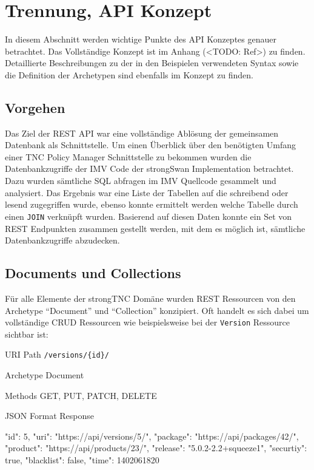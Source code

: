 \section{Trennung, API Konzept}
In diesem Abschnitt werden wichtige Punkte des API Konzeptes genauer betrachtet.
Das Vollständige Konzept ist im Anhang (<TODO: Ref>) zu finden. Detaillierte
Beschreibungen zu der in den Beispielen verwendeten Syntax sowie die Definition
der Archetypen sind ebenfalls im Konzept zu finden.

\subsection{Vorgehen}
Das Ziel der REST API war eine vollständige Ablösung der gemeinsamen Datenbank
als Schnittstelle. Um einen Überblick über den benötigten Umfang einer TNC
Policy Manager Schnittstelle zu bekommen wurden die Datenbankzugriffe der IMV
Code der strongSwan Implementation betrachtet. Dazu wurden sämtliche SQL
abfragen im IMV Quellcode gesammelt und analysiert. Das Ergebnis war eine Liste
der Tabellen auf die schreibend oder lesend zugegriffen wurde, ebenso konnte
ermittelt werden welche Tabelle durch einen \texttt{JOIN} verknüpft wurden.
Basierend auf diesen Daten konnte ein Set von REST Endpunkten zusammen gestellt
werden, mit dem es möglich ist, sämtliche Datenbankzugriffe abzudecken.

\subsection{Documents und Collections}
Für alle Elemente der strongTNC Domäne wurden REST Ressourcen von den Archetype
\enquote{Document} und \enquote{Collection} konzipiert. Oft handelt es sich
dabei um vollständige CRUD Ressourcen wie beispielsweise bei der
\texttt{Version} Ressource sichtbar ist:

\begin{mdframed}[style=def]
\begin{description*}
	\item[URI Path] \texttt{/versions/\{id\}/}
	\item[Archetype] Document
	\item[Methods] GET, PUT, PATCH, DELETE
	\item[JSON Format Response] \hfill
\begin{jsoncode}
{
	"id": 5,
	"uri": "https://api/versions/5/",
	"package": "https://api/packages/42/",
	"product": "https://api/products/23/",
	"release": "5.0.2-2.2+squeeze1",
	"securtiy": true,
	"blacklist": false,
	"time": 1402061820
}
\end{jsoncode}
\end{description*}
\end{mdframed}

